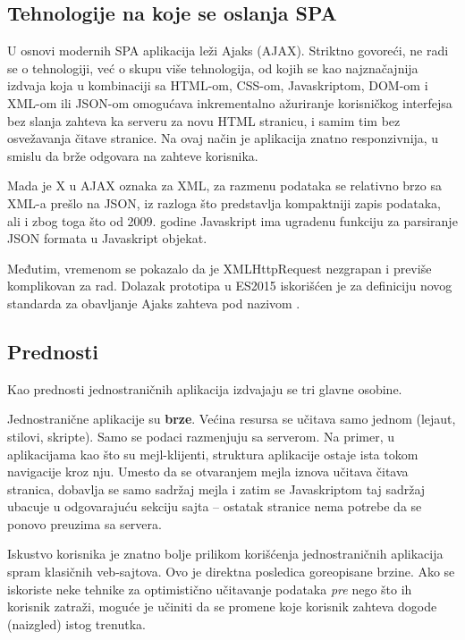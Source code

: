 \subsection{Tehnologije na koje se oslanja SPA}

U osnovi modernih SPA aplikacija leži Ajaks (AJAX).
Striktno govoreći, ne radi se o tehnologiji, već o skupu više tehnologija, od kojih se kao najznačajnija izdvaja  koja u kombinaciji sa HTML-om, CSS-om, Javaskriptom, DOM-om i XML-om ili JSON-om omogućava inkrementalno ažuriranje korisničkog interfejsa bez slanja zahteva ka serveru za novu HTML stranicu, i samim tim bez osvežavanja čitave stranice.
Na ovaj način je aplikacija znatno responzivnija, u smislu da brže odgovara na zahteve korisnika.

Mada je X u AJAX oznaka za XML, za razmenu podataka se relativno brzo sa XML-a prešlo na JSON, iz razloga što predstavlja kompaktniji zapis podataka, ali
i zbog toga što od 2009. godine Javaskript ima ugradenu funkciju za parsiranje JSON formata u Javaskript objekat.

Međutim, vremenom se pokazalo da je XMLHttpRequest nezgrapan i previše komplikovan za rad.
Dolazak prototipa  u ES2015 iskorišćen je za definiciju novog standarda za obavljanje Ajaks zahteva pod nazivom .

\subsection{Prednosti}

Kao prednosti jednostraničnih aplikacija izdvajaju se tri glavne osobine.

Jednostranične aplikacije su \textbf{brze}.
Većina resursa se učitava samo jednom (lejaut, stilovi, skripte).
Samo se podaci razmenjuju sa serverom.
Na primer, u aplikacijama kao što su mejl-klijenti, struktura aplikacije ostaje ista tokom navigacije kroz nju.
Umesto da se otvaranjem mejla iznova učitava čitava stranica, dobavlja se samo sadržaj mejla i zatim se Javaskriptom taj sadržaj ubacuje u odgovarajuću sekciju sajta -- ostatak stranice nema potrebe da se ponovo preuzima sa servera.

Iskustvo korisnika je znatno bolje prilikom korišćenja jednostraničnih aplikacija spram klasičnih veb-sajtova.
Ovo je direktna posledica goreopisane brzine.
Ako se iskoriste neke tehnike za optimistično učitavanje podataka \textit{pre} nego što ih korisnik zatraži, moguće je učiniti da se promene koje korisnik zahteva dogode (naizgled) istog trenutka.

